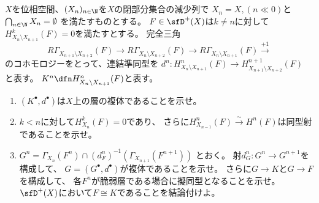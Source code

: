 \documentclass[uplatex,dvipdfmx]{jsarticle}
\begin{document}
\maketitle
\HeaderCommentA
\section{}

\fi


\begin{prob}\label{2.21}
  \(X\)を位相空間、\((X_n)_{n\in \N}\)を\(X\)の閉部分集合の減少列で
  \(X_n=X, (n \ll 0)\)と\(\bigcap_{n\in \N}X_n = \emptyset\)
  を満たすものとする。
  \(F\in \sfD^+(X)\)は\(k\neq n\)に対して
  \(H^k_{X_n\setminus X_{n+1}}(F)=0\)を満たすとする。
  完全三角
  \[
  R\Gamma_{X_{n+1}\setminus X_{n+2}}(F) \to
  R\Gamma_{X_n\setminus X_{n+2}}(F) \to
  R\Gamma_{X_n\setminus X_{n+1}}(F) \xrightarrow{+1}
  \]
  のコホモロジーをとって、連結準同型を
  \(d^n:H^n_{X_n\setminus X_{n+1}}(F) \to H^{n+1}_{X_{n+1}\setminus X_{n+2}}(F)\)
  と表す。
  \(K^n\dfn H^n_{X_n\setminus X_{n+1}}(F)\)と表す。
  \begin{enumerate}
    \item \label{2.21.1}
    \((K^{\bullet},d^{\bullet})\)は\(X\)上の層の複体であることを示せ。
    \item \label{2.21.2}
    \(k<n\)に対して\(H^k_{X_n}(F)=0\)であり、
    さらに\(H^n_{X_{n-1}}(F) \xrightarrow{\sim} H^n(F)\)は同型射であることを示せ。
    \item \label{2.21.3}
    \(G^n = \Gamma_{X_n}(F^n)\cap (d^n_F)^{-1}(\Gamma_{X_{n+1}}(F^{n+1}))\)
    とおく。
    射\(d_G^n:G^n\to G^{n+1}\)を構成して、
    \(G=(G^{\bullet},d^{\bullet})\)が複体であることを示せ。
    さらに\(G\to K\)と\(G\to F\)を構成して、
    各\(F^n\)が脆弱層である場合に擬同型となることを示せ。
    \(\sfD^+(X)\)において\(F\cong K\)であることを結論付けよ。
  \end{enumerate}
\end{prob}
\end{document}
